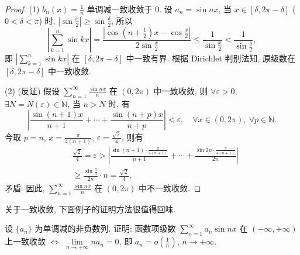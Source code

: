 \begin{proof}
(1) $b_{n}(x)=\frac{1}{n}$ 单调减一致收敛于 $0$. 设 $a_{n}=\sin nx$, 当 $x\in[\delta,2\pi-\delta]$ ($0<\delta<\pi$) 时, $\left|\sin\frac{x}{2}\right|\geqslant\sin\frac{\delta}{2}$, 所以
\[
  \left|\sum_{k=1}^{n}\sin kx\right|=\frac{\left|\cos\left(n+\frac{1}{2}\right)x-\cos\frac{x}{2}\right|}{2\sin\frac{x}{2}}\leqslant\frac{1}{\sin\frac{x}{2}}<\frac{1}{\sin\frac{\delta}{2}},
\]
即 $\left|\sum_{k=1}^{n}\sin kx\right|$ 在 $[\delta,2\pi-\delta]$ 中一致有界. 根据 Dirichlet 判别法知, 原级数在 $[\delta,2\pi-\delta]$ 中一致收敛.

(2) (反证) 假设 $\sum_{n=1}^{\infty}\frac{\sin nx}{n}$ 在 $(0,2\pi)$ 中一致收敛, 则 $\forall\varepsilon>0$, $\exists N=N(\varepsilon)\in\mathbb{N}$, 当 $n>N$ 时, 有
\[
  \left|\frac{\sin(n+1)x}{n+1}+\cdots+\frac{\sin(n+p)x}{n+p}\right|<\varepsilon,\quad\forall x\in(0,2\pi),\ \forall p\in\mathbb{N}.
\]
今取 $p=n$, $x=\frac{\pi}{4(n+1)}$, $\varepsilon=\frac{\sqrt{2}}{4}$, 则有
\[
  \begin{aligned}
    &\frac{\sqrt{2}}{4}=\varepsilon>\left|\frac{\sin(n+1)\cdot\frac{\pi}{4(n+1)}}{n+1}+\cdots+\frac{\sin2n\cdot\frac{\pi}{4(n+1)}}{2n}\right|\\
    &\geqslant\frac{\sin\frac{\pi}{4}}{2n}\cdot n=\frac{\sqrt{2}}{4},
  \end{aligned}
\]
矛盾. 因此, $\sum_{n=1}^{\infty}\frac{\sin nx}{n}$ 在 $(0,2\pi)$ 中不一致收敛.
\end{proof}

关于一致收敛, 下面例子的证明方法很值得回味.

\begin{example}\label{ex:13.1.18}
设 $\{a_{n}\}$ 为单调减的非负数列. 证明: 函数项级数 $\sum_{n=1}^{\infty}a_{n}\sin nx$ 在 $(-\infty,+\infty)$ 上一致收敛 $\Leftrightarrow$ $\lim\limits_{n\to+\infty}na_{n}=0$, 即 $a_{n}=o\left(\frac{1}{n}\right)$, $n\to+\infty$.
\end{example}

